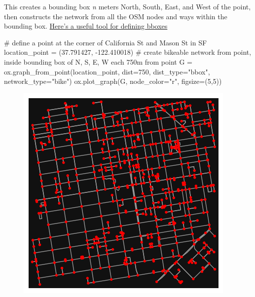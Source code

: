 \documentclass[
  letterpaper,
  DIV=11,
  numbers=noendperiod]{scrreprt}
\newenvironment{Shaded}{\begin{snugshade}}{\end{snugshade}}
\newcommand{\CommentTok}[1]{\textcolor[rgb]{0.37,0.37,0.37}{#1}}
\newcommand{\DecValTok}[1]{\textcolor[rgb]{0.68,0.00,0.00}{#1}}
\newcommand{\FloatTok}[1]{\textcolor[rgb]{0.68,0.00,0.00}{#1}}
\newcommand{\NormalTok}[1]{\textcolor[rgb]{0.00,0.23,0.31}{#1}}
\newcommand{\OperatorTok}[1]{\textcolor[rgb]{0.37,0.37,0.37}{#1}}
\newcommand{\StringTok}[1]{\textcolor[rgb]{0.13,0.47,0.30}{#1}}
\begin{document}
This creates a bounding box \emph{n} meters North, South, East, and West
of the point, then constructs the network from all the OSM nodes and
ways within the bounding box. \href{https://bboxfinder.com}{Here's a
useful tool for defining bboxes}

\begin{Shaded}
\begin{Highlighting}[]
\CommentTok{\# define a point at the corner of California St and Mason St in SF}
\NormalTok{location\_point }\OperatorTok{=}\NormalTok{ (}\FloatTok{37.791427}\NormalTok{, }\OperatorTok{{-}}\FloatTok{122.410018}\NormalTok{)}
\CommentTok{\# create bikeable network from point, inside bounding box of N, S, E, W each 750m from point}
\NormalTok{G }\OperatorTok{=}\NormalTok{ ox.graph\_from\_point(location\_point, dist}\OperatorTok{=}\DecValTok{750}\NormalTok{, dist\_type}\OperatorTok{=}\StringTok{"bbox"}\NormalTok{, network\_type}\OperatorTok{=}\StringTok{"bike"}\NormalTok{)}
\NormalTok{ox.plot\_graph(G, node\_color}\OperatorTok{=}\StringTok{"r"}\NormalTok{, figsize}\OperatorTok{=}\NormalTok{(}\DecValTok{5}\NormalTok{,}\DecValTok{5}\NormalTok{))}
\end{Highlighting}
\end{Shaded}

\begin{figure}[H]

{\centering \includegraphics{labs/w07_OSM_files/figure-pdf/cell-7-output-1.png}

}

\end{figure}
\end{document}
